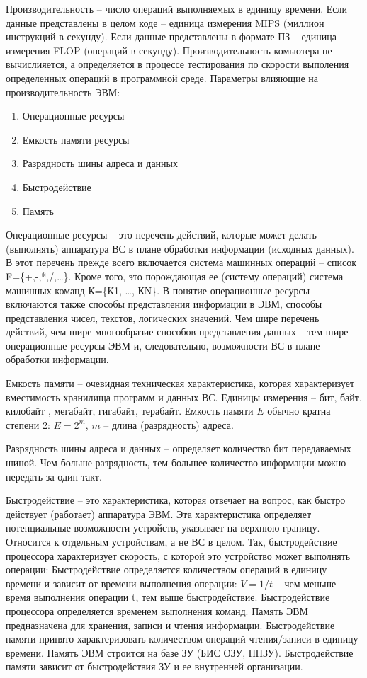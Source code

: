 \documentclass[unicode, 12pt, a4paper, oneside]{article}
\begin{document}
Производительность – число операций выполняемых в единицу времени. Если данные представлены в целом коде – единица измерения MIPS (миллион инструкций в секунду). Если данные представлены в  формате ПЗ – единица измерения FLOP (операций в секунду). Производительность комьютера не вычислияется, а определяется в процессе тестирования по скорости выполения определенных операций в программной среде.
Параметры влияющие на производительность ЭВМ:
\begin{enumerate}
\item Операционные ресурсы
\item Емкость памяти ресурсы
\item Разрядность шины адреса и данных
\item Быстродействие
\item Память
\end{enumerate}

Операционные ресурсы – это перечень действий, которые может делать (выполнять) аппаратура ВС в плане обработки информации (исходных данных). В этот перечень прежде всего включается система машинных операций – список F=\{+,-,*,/,…\}. Кроме того, это порождающая ее (систему операций) система машинных команд К=\{К1, …, КN\}. В понятие операционные ресурсы включаются также способы представления информации в ЭВМ, способы представления чисел, текстов, логических значений. Чем шире перечень действий, чем шире многообразие способов представления данных – тем шире операционные ресурсы ЭВМ и, следовательно, возможности ВС в плане обработки информации.

Емкость памяти – очевидная техническая характеристика, которая характеризует вместимость хранилища программ и данных ВС. Единицы измерения – бит,  байт,  килобайт , мегабайт,  гигабайт, терабайт.  Емкость  памяти $ E $ обычно  кратна степени 2: $ E = 2^{m}$, $ m $ – длина (разрядность) адреса.

Разрядность шины адреса и данных – определяет количество бит передаваемых шиной. Чем больше разрядность, тем большее количество информации можно передать за один такт.

Быстродействие – это характеристика, которая отвечает на вопрос, как быстро действует (работает) аппаратура ЭВМ. Эта характеристика определяет потенциальные возможности устройств, указывает на верхнюю границу. Относится к отдельным устройствам, а не ВС в целом. Так, быстродействие процессора характеризует скорость, с которой это устройство может выполнять операции: Быстродействие определяется количеством операций в единицу времени и зависит от времени выполнения операции: $ V=1/t $ – чем меньше время выполнения операции t, тем выше быстродействие. Быстродействие процессора определяется временем выполнения команд. Память ЭВМ предназначена для хранения, записи и чтения информации. Быстродействие памяти принято характеризовать количеством операций чтения/записи в единицу времени. Память ЭВМ строится на базе ЗУ (БИС ОЗУ, ППЗУ). Быстродействие памяти зависит от быстродействия ЗУ и ее внутренней организации. 
\end{document}
